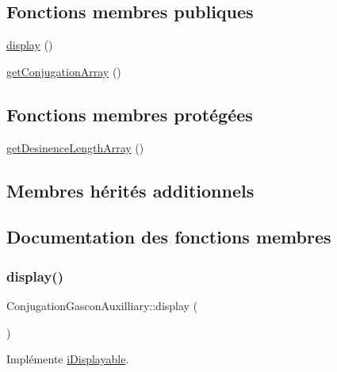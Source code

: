 \subsection*{Fonctions membres publiques}
\begin{DoxyCompactItemize}
\item 
\hyperlink{class_conjugation_gascon_auxilliary_ace722e9b661a8c1ff4ca860682124dd4}{display} ()
\item 
\hyperlink{class_conjugation_gascon_auxilliary_ad29935aa41057e3fb1967ee425f622e2}{get\+Conjugation\+Array} ()
\end{DoxyCompactItemize}
\subsection*{Fonctions membres protégées}
\begin{DoxyCompactItemize}
\item 
\hyperlink{class_conjugation_gascon_auxilliary_aee22cc89619cf7a697b30f2b2ab0eb73}{get\+Desinence\+Length\+Array} ()
\end{DoxyCompactItemize}
\subsection*{Membres hérités additionnels}


\subsection{Documentation des fonctions membres}
\hypertarget{class_conjugation_gascon_auxilliary_ace722e9b661a8c1ff4ca860682124dd4}{}\label{class_conjugation_gascon_auxilliary_ace722e9b661a8c1ff4ca860682124dd4} 
\subsubsection{\texorpdfstring{display()}{display()}}
{\footnotesize\ttfamily Conjugation\+Gascon\+Auxilliary\+::display (\begin{DoxyParamCaption}{ }\end{DoxyParamCaption})}



Implémente \hyperlink{interfacei_displayable_a0264fd455c876e897f754cf85f1681ca}{i\+Displayable}.

\hypertarget{class_conjugation_gascon_auxilliary_ad29935aa41057e3fb1967ee425f622e2}{}\label{class_conjugation_gascon_auxilliary_ad29935aa41057e3fb1967ee425f622e2} 
